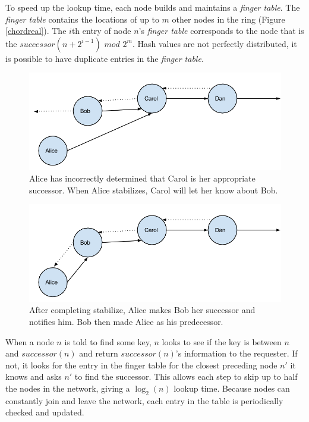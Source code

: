 \documentclass[10pt, conference, compsocconf]{IEEEtran}
\begin{document}
To speed up the lookup time, each node builds and maintains a \emph{finger table}.  The \emph{finger table} contains the locations of up to $m$ other nodes in the ring (Figure \ref{chordreal}).  The $i$th entry of node $n$'s \emph{finger table} corresponds to the node that is the $successor(n+2^{i-1})$ $mod$ $2^m$. Hash values are not perfectly distributed, it is possible to have duplicate entries in the \emph{finger table}. 


\begin{figure}
    \includegraphics[width=\linewidth]{abcd1}
    \caption{Alice has incorrectly determined that Carol is her appropriate successor.  When Alice stabilizes, Carol will let her know about Bob.}
    \label{abcd1}
\end{figure}


\begin{figure}
    \includegraphics[width=\linewidth]{abcd2}
    \caption{After completing stabilize, Alice makes Bob her successor and notifies him. Bob then made Alice as his predecessor.}
    \label{abcd2}
\end{figure}



When a node $n$ is told to find some key, $n$ looks to see if the key is between $n$ and $successor(n)$ and return $successor(n)$'s information to the requester. If not, it looks for the entry in the finger table for the closest preceding node $n'$ it knows and asks $n'$ to find the successor.  This allows each step to skip up to half the nodes in the network, giving a $\log_2(n)$ lookup time.  Because nodes can constantly join and leave the network, each entry in the table is periodically checked and updated. 
\end{document}
